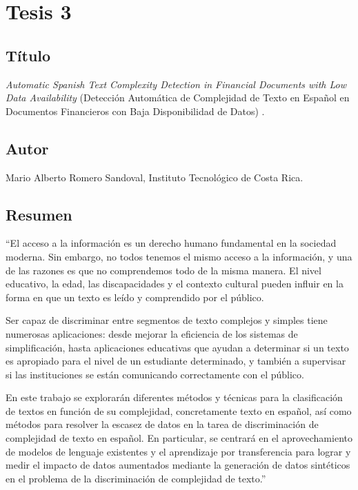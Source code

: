 \section{Tesis 3}

\subsection{Título}
\textit{Automatic Spanish Text Complexity Detection in Financial Documents with Low Data Availability} (Detección Automática de Complejidad de Texto en Español en Documentos Financieros con Baja Disponibilidad de Datos) \cite{romero2024}.

\subsection{Autor}
Mario Alberto Romero Sandoval, Instituto Tecnológico de Costa Rica.

\subsection{Resumen}
``El acceso a la información es un derecho humano fundamental en la sociedad moderna. Sin embargo, no todos tenemos el mismo acceso a la información, y una de las razones es que no comprendemos todo de la misma manera. El nivel educativo, la edad, las discapacidades y el contexto cultural pueden influir en la forma en que un texto es leído y comprendido por el público.

Ser capaz de discriminar entre segmentos de texto complejos y simples tiene numerosas aplicaciones: desde mejorar la eficiencia de los sistemas de simplificación, hasta aplicaciones educativas que ayudan a determinar si un texto es apropiado para el nivel de un estudiante determinado, y también a supervisar si las instituciones se están comunicando correctamente con el público.

En este trabajo se explorarán diferentes métodos y técnicas para la clasificación de textos en función de su complejidad, concretamente texto en español, así como métodos para resolver la escasez de datos en la tarea de discriminación de complejidad de texto en español. En particular, se centrará en el aprovechamiento de modelos de lenguaje existentes y el aprendizaje por transferencia para lograr y medir el impacto de datos aumentados mediante la generación de datos sintéticos en el problema de la discriminación de complejidad de texto.'' \cite{romero2024}


